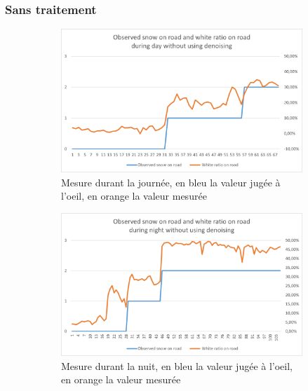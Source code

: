 \subsubsection{Sans traitement}
\begin{figure}[H]
    \begin{subfigure}{.45\textwidth}
        \includegraphics[width=\linewidth]{Images/computer_vision/snowOnRoad/dayMes_noise.png}
        \caption{Mesure durant la journée, en bleu la valeur jugée à l'oeil, en orange la valeur mesurée}
        \label{fig:SnowOnRoad_noise_dayMes}
    \end{subfigure}
    \hfill
    \begin{subfigure}{.45\textwidth}
        \includegraphics[width=\linewidth]{Images/computer_vision/snowOnRoad/nightMes_noise.png}
        \caption{Mesure durant la nuit, en bleu la valeur jugée à l'oeil, en orange la valeur mesurée}
        \label{fig:SnowOnRoad_noise_nightMes}
    \end{subfigure}
    \hfill
    \begin{subfigure}{.45\textwidth}

\end{subfigure}
\end{figure}
